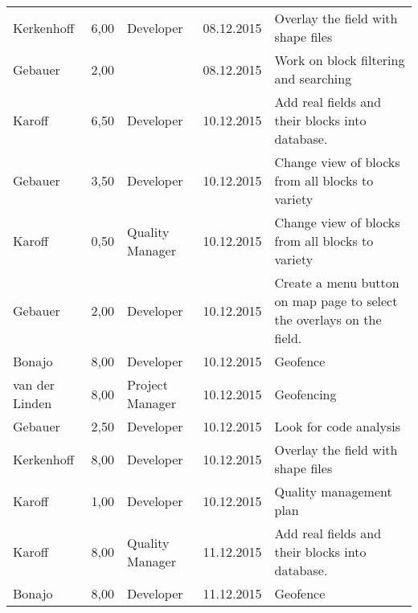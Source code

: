 \begin{longtable}{ l r p{2cm} c p{4cm} }
		Kerkenhoff              & 6,00           & Developer       & 08.12.2015    & Overlay the field with shape files                                              \\
		Gebauer                 & 2,00           &                 & 08.12.2015    & Work on block filtering and searching                                           \\
		Karoff                  & 6,50           & Developer       & 10.12.2015    & Add real fields and their blocks into database.                                 \\
		Gebauer                 & 3,50           & Developer       & 10.12.2015    & Change view of blocks from all blocks to variety                                \\
		Karoff                  & 0,50           & Quality Manager & 10.12.2015    & Change view of blocks from all blocks to variety                                \\
		Gebauer                 & 2,00           & Developer       & 10.12.2015    & Create a menu button on map page to select the overlays on the field.           \\
		Bonajo                  & 8,00           & Developer       & 10.12.2015    & Geofence                                                                        \\
		van der Linden          & 8,00           & Project Manager & 10.12.2015    & Geofencing                                                                      \\
		Gebauer                 & 2,50           & Developer       & 10.12.2015    & Look for code analysis                                                          \\
		Kerkenhoff              & 8,00           & Developer       & 10.12.2015    & Overlay the field with shape files                                              \\
		Karoff                  & 1,00           & Developer       & 10.12.2015    & Quality management plan                                                         \\
		Karoff                  & 8,00           & Quality Manager & 11.12.2015    & Add real fields and their blocks into database.                                 \\
		Bonajo                  & 8,00           & Developer       & 11.12.2015    & Geofence                                                                        \\

\end{longtable}
